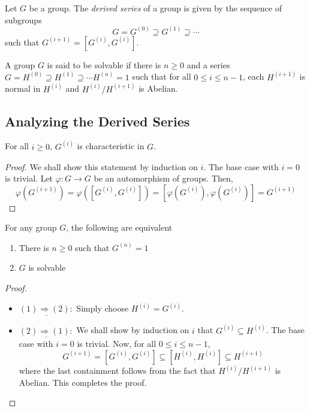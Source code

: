 \begin{definition}
    Let $G$ be a group. The \textit{derived series} of a group is given by the sequence of subgroups 
    \begin{equation*}
        G = G^{(0)}\supseteq G^{(1)}\supseteq\cdots
    \end{equation*}
    such that $G^{(i + 1)} = [G^{(i)}, G^{(i)}]$.
\end{definition}

\begin{definition}
    A group $G$ is said to be solvable if there is $n\ge 0$ and a series $G = H^{(0)}\supseteq H^{(1)}\supseteq\cdots H^{(n)} = 1$ such that for all $0\le i\le n - 1$, each $H^{(i + 1)}$ is normal in $H^{(i)}$ and $H^{(i)}/H^{(i + 1)}$ is Abelian.
\end{definition}

\subsection{Analyzing the Derived Series}
\begin{lemma}
    For all $i\ge 0$, $G^{(i)}$ is characteristic in $G$.
\end{lemma}
\begin{proof}
    We shall show this statement by induction on $i$. The base case with $i = 0$ is trivial. Let $\varphi: G\to G$ be an automorphism of groups. Then, 
    \begin{equation*}
        \varphi(G^{(i + 1)}) = \varphi([G^{(i)}, G^{(i)}]) = [\varphi(G^{(i)}), \varphi(G^{(i)})] = G^{(i + 1)}
    \end{equation*}
\end{proof}

\begin{theorem}
    For any group $G$, the following are equivalent
    \begin{enumerate}
        \item There is $n\ge 0$ such that $G^{(n)} = 1$
        \item $G$ is solvable
    \end{enumerate}
\end{theorem}
\begin{proof}
\hfill 
\begin{itemize}
    \item $\underline{(1)\Longrightarrow(2):}$ Simply choose $H^{(i)} = G^{(i)}$.
    \item $\underline{(2)\Longrightarrow(1):}$ We shall show by induction on $i$ that $G^{(i)}\subseteq H^{(i)}$. The base case with $i = 0$ is trivial. Now, for all $0\le i\le n - 1$,
    \begin{equation*}
        G^{(i + 1)} = [G^{(i)}, G^{(i)}]\subseteq [H^{(i)}, H^{(i)}]\subseteq H^{(i + 1)}
    \end{equation*}
    where the last containment follows from the fact that $H^{(i)}/H^{(i + 1)}$ is Abelian. This completes the proof.
\end{itemize}
\end{proof}

